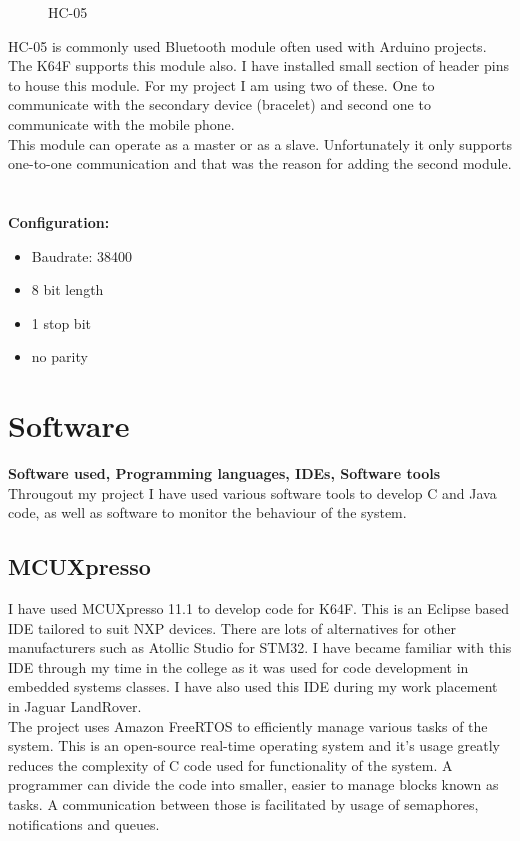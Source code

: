 \documentclass[12pt,a4paper]{article}
\begin{document}
\begin{figure}
			\caption[HC-05 Bluetooth module]{HC-05}
		\end{figure}

		HC-05 is commonly used Bluetooth module often used with Arduino projects. The K64F supports  
		this module also. I have installed small section of header pins to house this module. For my  
		project I am using two of these. One to communicate with the secondary device (bracelet) and  
		second one to communicate with the mobile phone.\\
		
		This module can operate as a master or as a slave. Unfortunately it only supports one-to-one  
		communication and that was the reason for adding the second module.\\\\\\
		
		{\bfseries Configuration:}
		\begin{itemize}
			\item Baudrate: 38400
			\item 8 bit length
			\item 1 stop bit
			\item no parity

		\end{itemize}
		\newpage
		
	\section{Software}
	{\bfseries Software used, Programming languages, IDEs, Software tools}\\
	Througout my project I have used various software tools to develop C and Java code, as well as
	software to monitor the behaviour of the system.
	
		\subsection{MCUXpresso}
		I have used MCUXpresso 11.1 to develop code for K64F. This is an Eclipse based IDE tailored to suit NXP devices. There are lots of alternatives for other manufacturers such as Atollic Studio for STM32. I have became familiar with this IDE through my time in the college as it 
		was used for code development in embedded systems classes. I have also used this IDE during my work placement in Jaguar LandRover.\\
		
		The project uses Amazon FreeRTOS to efficiently manage various tasks of the system. This is an open-source real-time operating system and it's usage greatly reduces the complexity of  C code used for functionality of the system. A programmer can divide the code into smaller, easier to manage blocks known as tasks. A communication between those is facilitated by usage of semaphores, notifications and queues.\\
		
\end{document}
